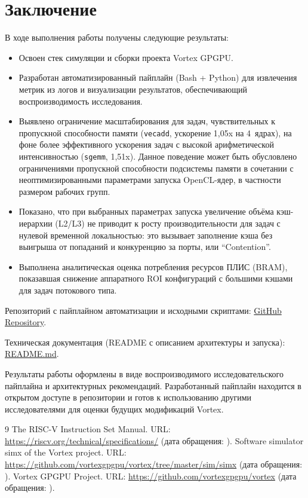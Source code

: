 \documentclass[a4paper]{article}
\begin{document}
\section{Заключение}

В ходе выполнения работы получены следующие результаты:

\begin{itemize}
    \item Освоен стек симуляции и сборки проекта Vortex GPGPU.
    \item Разработан автоматизированный пайплайн (Bash + Python) для извлечения метрик из логов и визуализации результатов, обеспечивающий воспроизводимость исследования.
    \item Выявлено ограничение масштабирования для задач, чувствительных к пропускной способности памяти (\texttt{vecadd}, ускорение 1{,}05x на 4~ядрах), на фоне более эффективного ускорения задач с высокой арифметической интенсивностью (\texttt{sgemm}, 1{,}51x). Данное поведение может быть обусловлено ограничениями пропускной способности подсистемы памяти в сочетании с неоптимизированными параметрами запуска OpenCL-ядер, в частности размером рабочих групп.
    \item Показано, что при выбранных параметрах запуска увеличение объёма кэш-иерархии (L2/L3) не приводит к росту производительности для задач с нулевой временной локальностью: это вызывает заполнение кэша без выигрыша от попаданий и конкуренцию за порты, или \enquote{Contention}.
    \item Выполнена аналитическая оценка потребления ресурсов ПЛИС (BRAM), показавшая снижение аппаратного ROI конфигураций с большими кэшами для задач потокового типа.
\end{itemize}

Репозиторий с пайплайном автоматизации и исходными скриптами: \href{https://github.com/Makuhin-Egor/Vortex-experiments-styding-practice}{GitHub Repository}.

Техническая документация (README с описанием архитектуры и запуска): \href{https://github.com/Makuhin-Egor/Vortex-experiments-styding-practice/blob/main/README.md}{README.md}.

Результаты работы оформлены в виде воспроизводимого исследовательского пайплайна и архитектурных рекомендаций. Разработанный пайплайн находится в открытом доступе в репозитории и готов к использованию другими исследователями для оценки будущих модификаций Vortex.

\begin{thebibliography}{9}
 The RISC-V Instruction Set Manual. URL: \url{https://riscv.org/technical/specifications/} (дата обращения: ).
 Software simulator simx of the Vortex project. URL: \url{https://github.com/vortexgpgpu/vortex/tree/master/sim/simx} (дата обращения: ).
 Vortex GPGPU Project. URL: \url{https://github.com/vortexgpgpu/vortex} (дата обращения: ).
\end{thebibliography}
\end{document}

